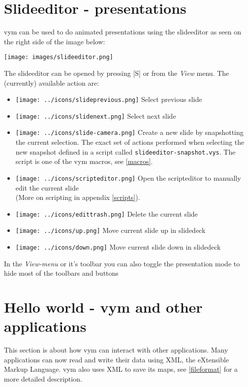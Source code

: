 \documentclass[12pt,a4paper]{article}
\newcommand{\vym}{{\sc vym }}
\newcommand{\key}[1]{[#1]}
\begin{document}
\section{Slideeditor - presentations}\label{slideeditor}
\vym can be used to do animated presentations using the slideeditor as
seen on the right side of the image below:
\begin{center}
    \texttt{[image: images/slideeditor.png]}
\end{center}
The slideeditor can be opened by pressing \key{S} or from the {\em View}
menu. The (currently) available action are:
\begin{itemize}
    \item
    \texttt{[image: ../icons/slideprevious.png]}
    Select previous slide

    \item
    \texttt{[image: ../icons/slidenext.png]}
    Select next slide

    \item
    \texttt{[image: ../icons/slide-camera.png]}
    Create a new slide by snapshotting the current selection. The exact
    set of actions performed when selecting the new snapshot defined in
    a script called {\tt slideeditor-snapshot.vys}. The script is one of
    the \vym macros, see \ref{macros}.

    \item
    \texttt{[image: ../icons/scripteditor.png]}
    Open the scripteditor to manually edit the current slide \\
    (More on scripting in appendix \ref{scripts}).
    
    \item
    \texttt{[image: ../icons/edittrash.png]}
    Delete the current slide
    
    \item
    \texttt{[image: ../icons/up.png]}
    Move current slide up in slidedeck
    
    \item
    \texttt{[image: ../icons/down.png]}
    Move current slide down in slidedeck
\end{itemize}
In the {\em View-menu} or it's toolbar you can also toggle the
presentation mode to hide most of the toolbars and buttons


\section{Hello world - vym and other applications}
This section is about how \vym can interact with other applications.
Many applications can now read and write their data using XML, the
eXtensible Markup Language. \vym also uses XML to save its maps, see
\ref{fileformat} for a more detailed description. 
\end{document}

